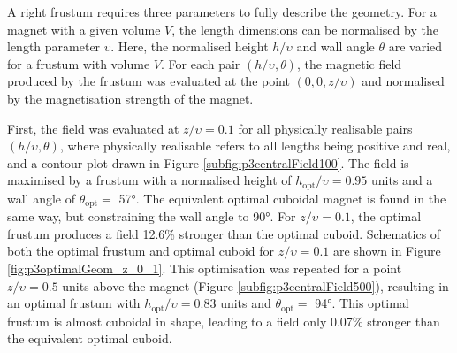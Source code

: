 A right frustum requires three parameters to fully describe the geometry. For a magnet with a given volume \(V\), the length dimensions can be normalised by the length parameter \(\upsilon\). Here, the normalised height \(h/\upsilon\) and wall angle \(\theta\) are varied for a frustum with volume \(V\). For each pair \((h/\upsilon,\theta)\), the magnetic field produced by the frustum was evaluated at the point \(\left( 0, 0, z/\upsilon\right)\) and normalised by the magnetisation strength of the magnet.

First, the field was evaluated at \(z/\upsilon = 0.1\) for all physically realisable pairs \(\left( h/\upsilon, \theta\right)\), where physically realisable refers to all lengths being positive and real, and a contour plot drawn in Figure \ref{subfig:p3centralField100}. The field is maximised by a frustum with a normalised height of \(h_\text{opt}/\upsilon = 0.95\) units and a wall angle of \(\theta_\text{opt} =\) \ang{57}. The equivalent optimal cuboidal magnet is found in the same way, but constraining the wall angle to \ang{90}. For \(z/\upsilon = 0.1\), the optimal frustum produces a field 12.6\% stronger than the optimal cuboid. Schematics of both the optimal frustum and optimal cuboid for \(z/\upsilon = 0.1\) are shown in Figure \ref{fig:p3optimalGeom_z_0_1}. This optimisation was repeated for a point \(z/\upsilon = 0.5\) units above the magnet (Figure \ref{subfig:p3centralField500}), resulting in an optimal frustum with \(h_\text{opt}/\upsilon = 0.83\) units and \(\theta_\text{opt} =\) \ang{94}. This optimal frustum is almost cuboidal in shape, leading to a field only 0.07\% stronger than the equivalent optimal cuboid.


